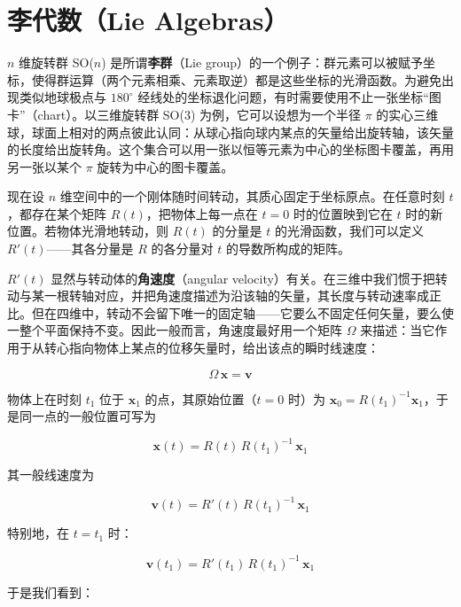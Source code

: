 \section{李代数（Lie Algebras）}

$n$ 维旋转群 SO($n$) 是所谓\textbf{李群}（Lie group）的一个例子：群元素可以被赋予坐标，使得群运算（两个元素相乘、元素取逆）都是这些坐标的光滑函数。为避免出现类似地球极点与 $180^\circ$ 经线处的坐标退化问题，有时需要使用不止一张坐标“图卡”（chart）。以三维旋转群 SO(3) 为例，它可以设想为一个半径 $\pi$ 的实心三维球，球面上相对的两点彼此认同：从球心指向球内某点的矢量给出旋转轴，该矢量的长度给出旋转角。这个集合可以用一张以恒等元素为中心的坐标图卡覆盖，再用另一张以某个 $\pi$ 旋转为中心的图卡覆盖。

现在设 $n$ 维空间中的一个刚体随时间转动，其质心固定于坐标原点。在任意时刻 $t$，都存在某个矩阵 $R(t)$，把物体上每一点在 $t=0$ 时的位置映到它在 $t$ 时的新位置。若物体光滑地转动，则 $R(t)$ 的分量是 $t$ 的光滑函数，我们可以定义 $R'(t)$——其各分量是 $R$ 的各分量对 $t$ 的导数所构成的矩阵。

$R'(t)$ 显然与转动体的\textbf{角速度}（angular velocity）有关。在三维中我们惯于把转动与某一根转轴对应，并把角速度描述为沿该轴的矢量，其长度与转动速率成正比。但在四维中，转动不会留下唯一的固定轴——它要么不固定任何矢量，要么使一整个平面保持不变。因此一般而言，角速度最好用一个矩阵 $\Omega$ 来描述：当它作用于从转心指向物体上某点的位移矢量时，给出该点的瞬时线速度：

\begin{equation}
\Omega\,\mathbf{x} = \mathbf{v}
\end{equation}

物体上在时刻 $t_1$ 位于 $\mathbf{x}_1$ 的点，其原始位置（$t=0$ 时）为 $\mathbf{x}_0 = R(t_1)^{-1}\mathbf{x}_1$，于是同一点的一般位置可写为

\begin{equation}
\mathbf{x}(t) = R(t)\,R(t_1)^{-1}\,\mathbf{x}_1
\end{equation}

其一般线速度为

\begin{equation}
\mathbf{v}(t) = R'(t)\,R(t_1)^{-1}\,\mathbf{x}_1
\end{equation}

特别地，在 $t=t_1$ 时：

\begin{equation}
\mathbf{v}(t_1) = R'(t_1)\,R(t_1)^{-1}\,\mathbf{x}_1
\end{equation}

于是我们看到：

